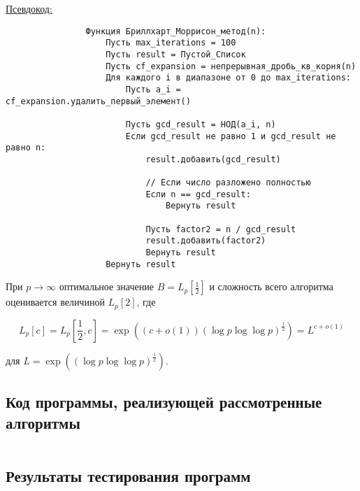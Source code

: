 \documentclass[bachelor, och, labwork]{shiza}
\begin{document}
        \underline{Псевдокод:}
            \begin{verbatim}
                Функция Бриллхарт_Моррисон_метод(n):
                    Пусть max_iterations = 100
                    Пусть result = Пустой_Список
                    Пусть cf_expansion = непрерывная_дробь_кв_корня(n)
                    Для каждого i в диапазоне от 0 до max_iterations:
                        Пусть a_i = cf_expansion.удалить_первый_элемент()
                
                        Пусть gcd_result = НОД(a_i, n)
                        Если gcd_result не равно 1 и gcd_result не равно n:
                            result.добавить(gcd_result)
                
                            // Если число разложено полностью
                            Если n == gcd_result:
                                Вернуть result
                
                            Пусть factor2 = n / gcd_result
                            result.добавить(factor2)
                            Вернуть result
                    Вернуть result
            \end{verbatim}

            При $p \to \infty$ оптимальное значение $B = L_p [\frac{1}{2}]$ и
            сложность всего алгоритма оценивается величиной $L_p [2]$, где
            
            \[L_p [c] = L_p [\frac{1}{2}, c] = \exp \left((c + o(1)) (\log p
            \log \log p)^{\frac{1}{2}} \right) = L^{c + o(1)}\]
            
            для $L = \exp \left( (\log p \log \log p)^{\frac{1}{2}} \right)$.\\
    
    \subsection{Код программы, реализующей рассмотренные алгоритмы}

        \inputminted[breaklines,fontsize=\small,linenos]{rust}{../code/src/main.rs}

    \subsection{Результаты тестирования программ}
\end{document}
